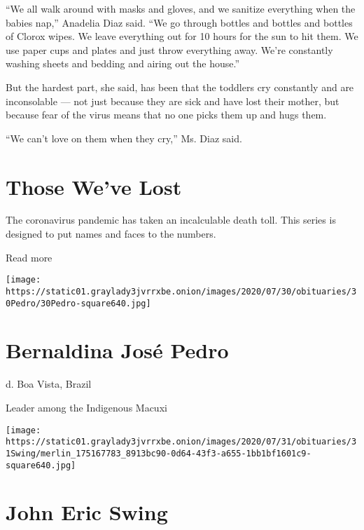 ``We all walk around with masks and gloves, and we sanitize everything
when the babies nap,'' Anadelia Diaz said. ``We go through bottles and
bottles and bottles of Clorox wipes. We leave everything out for 10
hours for the sun to hit them. We use paper cups and plates and just
throw everything away. We're constantly washing sheets and bedding and
airing out the house.''

But the hardest part, she said, has been that the toddlers cry
constantly and are inconsolable --- not just because they are sick and
have lost their mother, but because fear of the virus means that no one
picks them up and hugs them.

``We can't love on them when they cry,'' Ms. Diaz said.

\href{https://www.nytimes3xbfgragh.onion/interactive/2020/obituaries/people-died-coronavirus-obituaries.html?action=click\&pgtype=Article\&state=default\&region=BELOW_MAIN_CONTENT\&context=covid_obits_promo}{}

\hypertarget{those-weve-lost}{%
\section{Those We've Lost}\label{those-weve-lost}}

The coronavirus pandemic has taken an incalculable death toll. This
series is designed to put names and faces to the numbers.

Read more

\texttt{[image: https://static01.graylady3jvrrxbe.onion/images/2020/07/30/obituaries/30Pedro/30Pedro-square640.jpg]}

\hypertarget{bernaldina-josuxe9-pedro}{%
\section{Bernaldina José Pedro}\label{bernaldina-josuxe9-pedro}}

d. Boa Vista, Brazil

Leader among the Indigenous Macuxi

\texttt{[image: https://static01.graylady3jvrrxbe.onion/images/2020/07/31/obituaries/31Swing/merlin\_175167783\_8913bc90-0d64-43f3-a655-1bb1bf1601c9-square640.jpg]}

\hypertarget{john-eric-swing}{%
\section{John Eric Swing}\label{john-eric-swing}}

